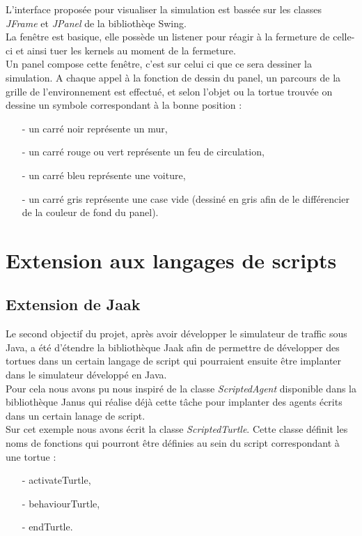\documentclass[a4paper,12pt]{report}
\begin{document}
L'interface proposée pour visualiser la simulation est bassée sur les classes \emph{JFrame} et \emph{JPanel} de la bibliothèqe Swing. \\

La fenêtre est basique, elle possède un listener pour réagir à la fermeture de celle-ci et ainsi tuer les kernels au moment de la fermeture.\\

Un panel compose cette fenêtre, c'est sur celui ci que ce sera dessiner la simulation. A chaque appel à la fonction de dessin du panel, un parcours de la grille de l'environnement est effectué, et selon l'objet ou la tortue trouvée on dessine un symbole correspondant à la bonne position :
\begin{itemize}
\item[-]un carré noir représente un mur,
\item[-]un carré rouge ou vert représente un feu de circulation,
\item[-]un carré bleu représente une voiture,
\item[-]un carré gris représente une case vide (dessiné en gris afin de le différencier de la couleur de fond du panel).
\end{itemize}


\chapter{Extension aux langages de scripts}

\section{Extension de Jaak}

Le second objectif du projet, après avoir développer le simulateur de traffic sous Java, a été d'étendre la bibliothèque Jaak afin de permettre de développer des tortues dans un certain langage de script qui pourraient ensuite être implanter dans le simulateur développé en Java. \\

Pour cela nous avons pu nous inspiré de la classe \emph{ScriptedAgent} disponible dans la bibliothèque Janus qui réalise déjà cette tâche pour implanter des agents écrits dans un certain lanage de script. \\

Sur cet exemple nous avons écrit la classe \emph{ScriptedTurtle}. Cette classe définit les noms de fonctions qui pourront être définies au sein du script correspondant à une tortue :
\begin{itemize}
 \item[-]activateTurtle,
 \item[-]behaviourTurtle,
 \item[-]endTurtle.\\
\end{itemize}
\end{document}
